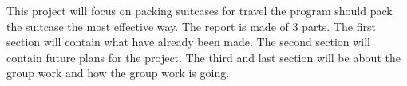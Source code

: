 This project will focus on packing suitcases for travel the program should pack the suitcase the most effective way. The report is made of 3 parts. The first section will contain what have already been made. The second section will contain future plans for the project. The third and last section will be about the group work and how the group work is going.
